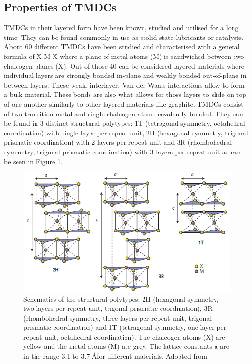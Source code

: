 \documentclass[12pt]{article}
\begin{document}
	\subsection{Properties of TMDCs}
	TMDCs in their layered form have been known, studied and utilised for a long time. They can be found commonly in use as stolid-state lubricants or catalysts. About 60 different TMDCs have been studied and characterised with a general formula of X-M-X where a plane of metal atoms (M) is sandwiched between two chalcogen planes (X). Out of those 40 can be considered layered materials where individual layers are strongly bonded in-plane and weakly bonded out-of-plane in between layers. These weak, interlayer, Van der Waals interactions allow to form a bulk material. These bonds are also what allows for those layers to slide on top of one another similarly to other layered materials like graphite. 
	TMDCs consist of two transition metal and single chalcogen atoms covalently bonded. They can be found in 3 distinct structural polytypes: 1T (tetragonal symmetry, octahedral coordination) with single layer per repeat unit, 2H (hexagonal symmetry, trigonal prismatic coordination) with 2 layers per repeat unit and 3R (rhombohedral symmetry, trigonal prismatic coordination) with 3 layers per repeat unit \cite{ElectronicsAndOptoelectronicsOfTwo-dimensionalTransitionMetalDichalcogenides} as can be seen in Figure \ref{fig:TMDCPolytypes}.
	
	\begin{figure}[h]
	\begin{center}
	\includegraphics[scale=0.7]{TMDCPolytypes.png}
	\caption{Schematics of the structural polytypes: 2H (hexagonal symmetry, two layers per repeat unit, trigonal prismatic coordination), 3R (rhombohedral symmetry, three layers per repeat unit, trigonal prismatic coordination) and 1T (tetragonal symmetry, one layer per repeat unit, octahedral coordination). The chalcogen atoms (X) are yellow and the metal atoms (M) are grey. The lattice constants a are in the range 3.1 to 3.7 \AA for different materials. Adopted from \cite{ElectronicsAndOptoelectronicsOfTwo-dimensionalTransitionMetalDichalcogenides}}
	\label{fig:TMDCPolytypes}
	\end{center}
	\end{figure}
	
\end{document}
